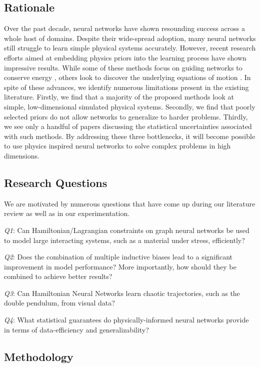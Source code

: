 \documentclass{article}
\begin{document}
\subsection*{Rationale}
Over the past decade, neural networks have shown resounding success across a whole host of domains. Despite their wide-spread adoption, many neural networks still struggle to learn simple physical systems accurately. However, recent research efforts aimed at embedding physics priors into the learning process have shown impressive results. While some of these methods focus on guiding networks to conserve energy \cite{greydanus_hamiltonian_2019,toth_hamiltonian_2019}, others look to discover the underlying equations of motion \cite{udrescu_symbolic_2020,iten_discovering_2020,brunton_discovering_2016}.  In spite of these advances, we identify numerous limitations present in the existing literature. Firstly, we find that a majority of the proposed methods look at simple, low-dimensional simulated physical systems. Secondly, we find that poorly selected priors do not allow networks to generalize to harder problems. Thirdly, we see only a handful of papers discussing the statistical uncertainties associated with such methods. By addressing these three bottlenecks, it will become possible to use physics inspired neural networks to solve complex problems in high dimensions. 

\subsection*{Research Questions}

We are motivated by numerous questions that have come up during our literature review as well as in our experimentation.

\textit{Q1}: Can Hamiltonian/Lagrangian constraints on graph neural networks be used to model large interacting systems, such as a material under stress, efficiently?

\textit{Q2}: Does the combination of multiple inductive biases lead to a significant improvement in model performance? More importantly, how should they be combined to achieve better results?

\textit{Q3}: Can Hamiltonian Neural Networks learn chaotic trajectories, such as the double pendulum, from visual data?

\textit{Q4}: What statistical guarantees do physically-informed neural networks provide in terms of data-efficiency and generalizability?

\subsection*{Methodology}
\end{document}
